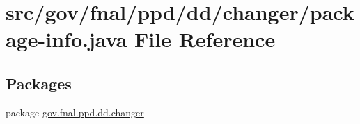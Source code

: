 \hypertarget{gov_2fnal_2ppd_2dd_2changer_2package-info_8java}{\section{src/gov/fnal/ppd/dd/changer/package-\/info.java File Reference}
\label{gov_2fnal_2ppd_2dd_2changer_2package-info_8java}
}
\subsection*{Packages}
\begin{DoxyCompactItemize}
\item 
package \hyperlink{namespacegov_1_1fnal_1_1ppd_1_1dd_1_1changer}{gov.\-fnal.\-ppd.\-dd.\-changer}
\end{DoxyCompactItemize}
